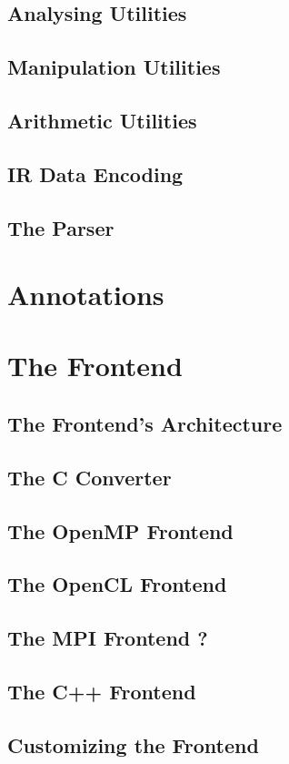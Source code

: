 \subsection{Analysing Utilities}
\subsection{Manipulation Utilities}
\subsection{Arithmetic Utilities}
\subsection{IR Data Encoding}
\subsection{The Parser}

\section{Annotations}

\section{The Frontend}
\subsection{The Frontend's Architecture}
\subsection{The C Converter}
\subsection{The OpenMP Frontend}
\subsection{The OpenCL Frontend}
\subsection{The MPI Frontend ?}
\subsection{The C++ Frontend}
\subsection{Customizing the Frontend}

